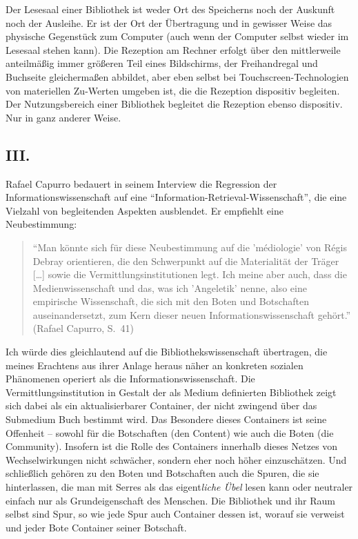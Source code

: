 \documentclass[output=paper]{langscibook}
\begin{document}
Der Lesesaal einer Bibliothek ist weder Ort des Speicherns noch der
Auskunft noch der Ausleihe. Er ist der Ort der Übertragung und in
gewisser Weise das physische Gegenstück zum Computer (auch wenn der
Computer selbst wieder im Lesesaal stehen kann). Die Rezeption am
Rechner erfolgt über den mittlerweile anteilmäßig immer größeren Teil
eines Bildschirms, der Freihandregal und Buchseite gleichermaßen
abbildet, aber eben selbst bei Touchscreen-Technologien von materiellen
Zu-Werten umgeben ist, die die Rezeption dispositiv begleiten. Der
Nutzungsbereich einer Bibliothek begleitet die Rezeption ebenso
dispositiv. Nur in ganz anderer Weise.

\hypertarget{iii.}{%
\subsection*{III.}\label{iii.}}

Rafael Capurro bedauert in seinem Interview die Regression der
Informationswissenschaft auf eine
\enquote{Information-Retrieval-Wissenschaft}, die eine Vielzahl von
begleitenden Aspekten ausblendet. Er empfiehlt eine Neubestimmung:

\begin{quote}
\enquote{Man könnte sich für diese Neubestimmung auf die 'médiologie'
von Régis Debray orientieren, die den Schwerpunkt auf die Materialität
der Träger {[}\ldots{]} sowie die Vermittlungsinstitutionen legt. Ich
meine aber auch, dass die Medienwissenschaft und das, was ich
'Angeletik' nenne, also eine empirische Wissenschaft, die sich mit den
Boten und Botschaften auseinandersetzt, zum Kern dieser neuen
Informationswissenschaft gehört.} (Rafael Capurro, S.~41)
\end{quote}

\noindent Ich würde dies gleichlautend auf die Bibliothekswissenschaft übertragen,
die meines Erachtens aus ihrer Anlage heraus näher an konkreten sozialen
Phänomenen operiert als die Informationswissenschaft. Die
Vermittlungsinstitution in Gestalt der als Medium definierten Bibliothek
zeigt sich dabei als ein aktualisierbarer Container, der nicht zwingend
über das Submedium Buch bestimmt wird. Das Besondere dieses Containers
ist seine Offenheit -- sowohl für die Botschaften (den Content) wie auch
die Boten (die Community). Insofern ist die Rolle des Containers
innerhalb dieses Netzes von Wechselwirkungen nicht schwächer, sondern
eher noch höher einzuschätzen. Und schließlich gehören zu den Boten und
Botschaften auch die Spuren, die sie hinterlassen, die man mit Serres
als das eigent\emph{liche Übel} lesen kann oder neutraler einfach nur
als Grundeigenschaft des Menschen. Die Bibliothek und ihr Raum selbst
sind Spur, so wie jede Spur auch Container dessen ist, worauf sie
verweist und jeder Bote Container seiner Botschaft.
\end{document}
